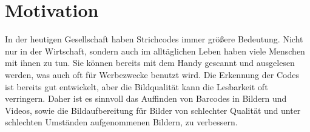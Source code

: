 \section{Motivation}
In der heutigen Gesellschaft haben Strichcodes immer größere Bedeutung.
Nicht nur in der Wirtschaft, sondern auch im alltäglichen Leben haben viele Menschen mit ihnen zu tun.
Sie können bereits mit dem Handy gescannt und ausgelesen werden, was auch oft für Werbezwecke benutzt wird.
Die Erkennung der Codes ist bereits gut entwickelt, aber die Bildqualität kann die Lesbarkeit oft verringern.
Daher ist es sinnvoll das Auffinden von Barcodes in Bildern und Videos, sowie die Bildaufbereitung für Bilder von schlechter Qualität und unter schlechten Umständen aufgenommenen Bildern, zu verbessern.

